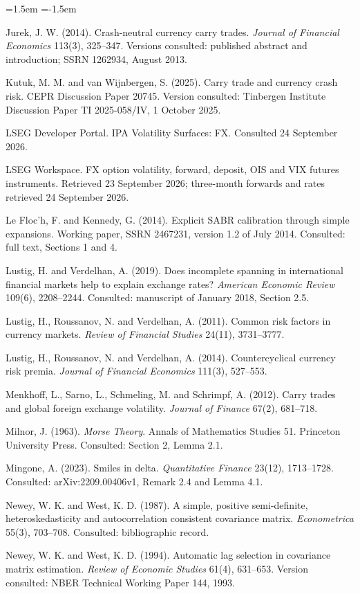\documentclass[11pt]{article}
\theoremstyle{result}
\begin{document}
\begin{list}{}{\leftmargin=1.5em \itemindent=-1.5em \itemsep=2pt \parsep=0pt}
\item Jurek, J. W. (2014). Crash-neutral currency carry trades. \emph{Journal of Financial Economics} 113(3), 325--347. Versions consulted: published abstract and introduction; SSRN 1262934, August 2013.
\item Kutuk, M. M. and van Wijnbergen, S. (2025). Carry trade and currency crash risk. CEPR Discussion Paper 20745. Version consulted: Tinbergen Institute Discussion Paper TI 2025-058/IV, 1 October 2025.
\item LSEG Developer Portal. IPA Volatility Surfaces: FX. Consulted 24 September 2026.
\item LSEG Workspace. FX option volatility, forward, deposit, OIS and VIX futures instruments. Retrieved 23 September 2026; three-month forwards and rates retrieved 24 September 2026.
\item Le Floc'h, F. and Kennedy, G. (2014). Explicit SABR calibration through simple expansions. Working paper, SSRN 2467231, version 1.2 of July 2014. Consulted: full text, Sections 1 and 4.
\item Lustig, H. and Verdelhan, A. (2019). Does incomplete spanning in international financial markets help to explain exchange rates? \emph{American Economic Review} 109(6), 2208--2244. Consulted: manuscript of January 2018, Section 2.5.
\item Lustig, H., Roussanov, N. and Verdelhan, A. (2011). Common risk factors in currency markets. \emph{Review of Financial Studies} 24(11), 3731--3777.
\item Lustig, H., Roussanov, N. and Verdelhan, A. (2014). Countercyclical currency risk premia. \emph{Journal of Financial Economics} 111(3), 527--553.
\item Menkhoff, L., Sarno, L., Schmeling, M. and Schrimpf, A. (2012). Carry trades and global foreign exchange volatility. \emph{Journal of Finance} 67(2), 681--718.
\item Milnor, J. (1963). \emph{Morse Theory}. Annals of Mathematics Studies 51. Princeton University Press. Consulted: Section 2, Lemma 2.1.
\item Mingone, A. (2023). Smiles in delta. \emph{Quantitative Finance} 23(12), 1713--1728. Consulted: arXiv:2209.00406v1, Remark 2.4 and Lemma 4.1.
\item Newey, W. K. and West, K. D. (1987). A simple, positive semi-definite, heteroskedasticity and autocorrelation consistent covariance matrix. \emph{Econometrica} 55(3), 703--708. Consulted: bibliographic record.
\item Newey, W. K. and West, K. D. (1994). Automatic lag selection in covariance matrix estimation. \emph{Review of Economic Studies} 61(4), 631--653. Version consulted: NBER Technical Working Paper 144, 1993.

\end{list}
\end{document}
